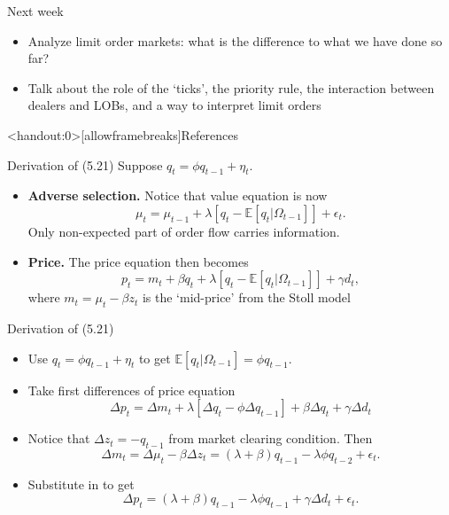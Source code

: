 \documentclass[english,10pt
,aspectratio=169
]{beamer}
\begin{document}
\begin{frame}{Next week}
\begin{itemize}
	\item Analyze limit order markets: what is the difference to what we have done so far?
	\item Talk about the role of the `ticks', the priority rule, the interaction between dealers and LOBs, and a way to interpret limit orders
\end{itemize}
\end{frame}




\appendix
\begin{frame}<handout:0>[allowframebreaks]{References}


\end{frame}



\begin{frame}[label=derivation, noframenumbering]{Derivation of (5.21)}
	Suppose $q_t=\phi q_{t-1}+\eta_{t}$. 
	\begin{itemize}
		\item \textbf{Adverse selection.} Notice that value equation is now
		\[
		\mu_t=\mu_{t-1}+\lambda[q_t-\mathbb{E}[q_t|\Omega_{t-1}]]+\epsilon_t.
		\]
		Only non-expected part of order flow carries information. 
		\item \textbf{Price.} The price equation then becomes
		\[
		p_t=m_t+\beta q_t+\lambda[q_t-\mathbb{E}[q_t|\Omega_{t-1}]]+\gamma d_t,
		\]
		where $m_t=\mu_t-\beta z_t$ is the `mid-price' from the Stoll model 
	\end{itemize}
\end{frame}


\begin{frame}[noframenumbering]{Derivation of (5.21)}
	\begin{itemize}
		\item Use $q_t=\phi q_{t-1}+\eta_{t}$ to get $\mathbb{E}[q_t|\Omega_{t-1}]=\phi q_{t-1}$.
		\item Take first differences of price equation
		\[
		\Delta p_t = \Delta m_t + \lambda [ \Delta q_t-\phi\Delta q_{t-1}]+\beta \Delta q_t+\gamma \Delta d_t
		\]
		\item Notice that $\Delta z_t=-q_{t-1}$ from market clearing condition. Then
		\[
		\Delta m_t = \Delta \mu_t-\beta \Delta z_t = (\lambda+\beta)q_{t-1}-\lambda \phi q_{t-2}+\epsilon_t.
		\]
		\item Substitute in to get
		\[
		\Delta p_t =(\lambda+\beta)q_{t-1} - \lambda\phi  q_{t-1}+\gamma \Delta d_t+\epsilon_t.
		\]
		\hyperlink{extending}{}
	\end{itemize}
\end{frame}
\end{document}
